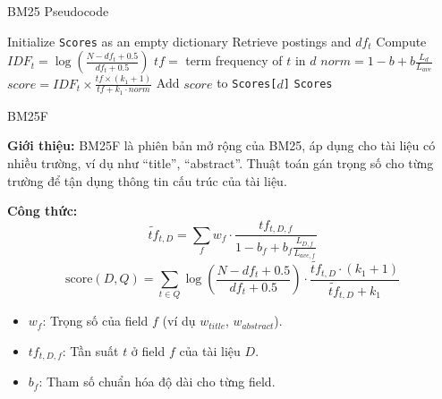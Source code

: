 \documentclass[10pt,aspectratio=169]{beamer}
\begin{document}
\begin{frame}{BM25 Pseudocode}
\vspace{-0.7em}
\scriptsize
\begin{tcolorbox}[colback=lightblue,colframe=ptitblue,boxrule=0.4pt,title=BM25 Algorithm (Pseudocode)]
\vspace{-1em}
\begin{algorithm}[H]
\begin{algorithmic}[1]
\State Initialize \texttt{Scores} as an empty dictionary
        \State Retrieve postings and $df_t$
        \State Compute $IDF_t = \log \left(\frac{N-df_t+0.5}{df_t+0.5}\right)$
            \State $tf =$ term frequency of $t$ in $d$
            \State $norm = 1 - b + b \frac{L_d}{L_{ave}}$
            \State $score = IDF_t \times \frac{tf \times (k_1 + 1)}{tf + k_1 \cdot norm}$
            \State Add $score$ to \texttt{Scores[$d$]}
        \EndFor
    \EndIf
\EndFor
\State \Return \texttt{Scores}
\end{algorithmic}
\end{algorithm}
\end{tcolorbox}
\normalsize
\end{frame}

\begin{frame}{BM25F}
\begin{tcolorbox}[colback=lightblue,boxrule=0pt]
\textbf{Giới thiệu:}
BM25F là phiên bản mở rộng của BM25, áp dụng cho tài liệu có nhiều trường, ví dụ như ``title'', ``abstract''. Thuật toán gán trọng số cho từng trường để tận dụng thông tin cấu trúc của tài liệu.
\end{tcolorbox}

\vspace{0.6em}
\textbf{Công thức:}
\[
\tilde{tf}_{t,D} = \sum_{f} w_f \cdot \frac{tf_{t,D,f}}{1-b_f+b_f\frac{L_{D,f}}{L_{ave,f}}}
\]
\[
\text{score}(D, Q) = \sum_{t\in Q}
\log\left(\frac{N-df_t+0.5}{df_t+0.5}\right) \cdot
\frac{\tilde{tf}_{t,D} \cdot (k_1+1)}{\tilde{tf}_{t,D}+k_1}
\]
\vspace{-0.5em}
\begin{itemize}
    \item $w_f$: Trọng số của field $f$ (ví dụ $w_{title}$, $w_{abstract}$).
    \item $tf_{t,D,f}$: Tần suất $t$ ở field $f$ của tài liệu $D$.
    \item $b_f$: Tham số chuẩn hóa độ dài cho từng field.
\end{itemize}
\end{frame}
\end{document}
